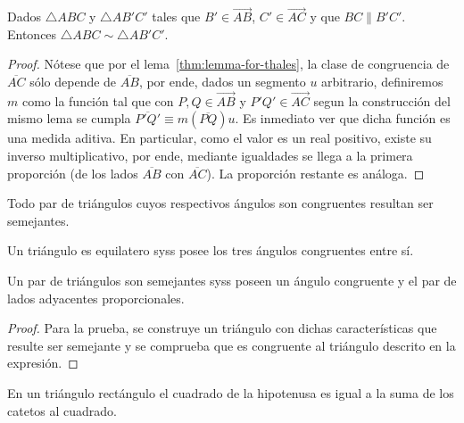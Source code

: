 \documentclass[11pt,a4paper]{book}
\begin{document}
\begin{thm}
Dados $\triangle ABC$ y $\triangle AB'C'$ tales que $B'\in\overrightarrow{AB}$, $C'\in\overrightarrow{AC}$ y que $BC\parallel B'C'$. Entonces $\triangle ABC\sim\triangle AB'C'$. 
\end{thm}
\begin{proof}
Nótese que por el lema~\ref{thm:lemma-for-thales}, la clase de congruencia de $\overline{AC}$ sólo depende de $\overline{AB}$, por ende, dados un segmento $u$ arbitrario, definiremos $m$ como la función tal que con $P,Q\in\overrightarrow{AB}$ y $P'Q'\in\overrightarrow{AC}$ segun la construcción del mismo lema se cumpla $\overline{P'Q'}\equiv m(\overline{PQ})u$. Es inmediato ver que dicha función es una medida aditiva. En particular, como el valor es un real positivo, existe su inverso multiplicativo, por ende, mediante igualdades se llega a la primera proporción (de los lados $\overline{AB}$ con $\overline{AC}$). La proporción restante es análoga.
\end{proof}
\begin{thm}
Todo par de triángulos cuyos respectivos ángulos son congruentes resultan ser semejantes.
\end{thm}
\begin{cor}
Un triángulo es equilatero syss posee los tres ángulos congruentes entre sí.
\end{cor}
\begin{thm}
Un par de triángulos son semejantes syss poseen un ángulo congruente y el par de lados adyacentes proporcionales.
\end{thm}
\begin{proof}
Para la prueba, se construye un triángulo con dichas características que resulte ser semejante y se comprueba que es congruente al triángulo descrito en la expresión.
\end{proof}
\begin{thm}
En un triángulo rectángulo el cuadrado de la hipotenusa es igual a la suma de los catetos al cuadrado.
\end{thm}
\end{document}
